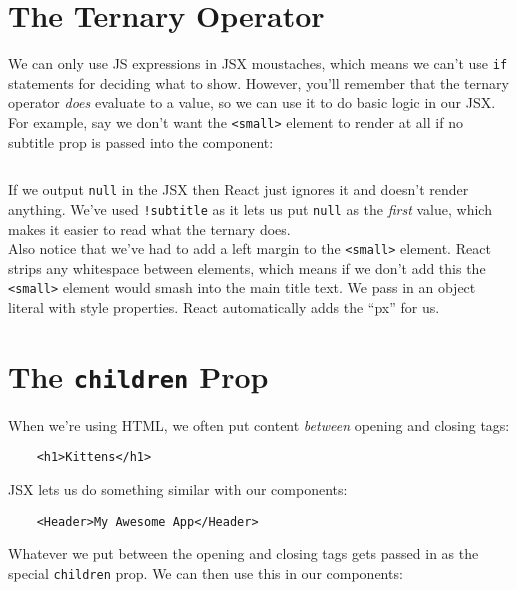 \section{The Ternary Operator}

We can only use JS expressions in JSX moustaches, which means we can't use \texttt{if} statements for deciding what to show. However, you'll remember that the ternary operator \textit{does} evaluate to a value, so we can use it to do basic logic in our JSX.
\\

For example, say we don't want the \texttt{<small>} element to render at all if no subtitle prop is passed into the component:

\inputminted{jsx}{03-props/figures/07-Header-ternary.jsx}

If we output \texttt{null} in the JSX then React just ignores it and doesn't render anything. We've used \texttt{!subtitle} as it lets us put \texttt{null} as the \textit{first} value, which makes it easier to read what the ternary does.
\\

Also notice that we've had to add a left margin to the \texttt{<small>} element. React strips any whitespace between elements, which means if we don't add this the \texttt{<small>} element would smash into the main title text. We pass in an object literal with style properties. React automatically adds the ``px'' for us.




\section{The \texttt{children} Prop}

When we're using HTML, we often put content \textit{between} opening and closing tags:

\begin{verbatim}
    <h1>Kittens</h1>
\end{verbatim}

JSX lets us do something similar with our components:

\begin{verbatim}
    <Header>My Awesome App</Header>
\end{verbatim}

Whatever we put between the opening and closing tags gets passed in as the special \texttt{children} prop. We can then use this in our components:

\inputminted{jsx}{03-props/figures/08-Header-children.jsx}

